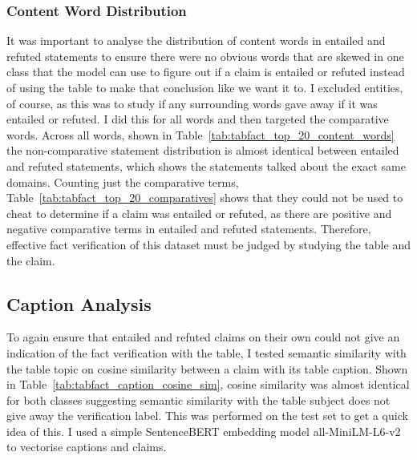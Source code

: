 \subsubsection{Content Word Distribution}
It was important to analyse the distribution of content words in entailed and refuted statements to ensure there were no obvious words that are skewed in one class that the model can use to figure out if a claim is entailed or refuted instead of using the table to make that conclusion like we want it to. I excluded entities, of course, as this was to study if any surrounding words gave away if it was entailed or refuted. I did this for all words and then targeted the comparative words. Across all words, shown in Table~\ref{tab:tabfact_top_20_content_words} the non-comparative statement distribution is almost identical between entailed and refuted statements, which shows the statements talked about the exact same domains. Counting just the comparative terms, Table~\ref{tab:tabfact_top_20_comparatives} shows that they could not be used to cheat to determine if a claim was entailed or refuted, as there are positive and negative comparative terms in entailed and refuted statements. Therefore, effective fact verification of this dataset must be judged by studying the table and the claim.



\subsection{Caption Analysis}
To again ensure that entailed and refuted claims on their own could not give an indication of the fact verification with the table, I tested semantic similarity with the table topic on cosine similarity between a claim with its table caption. Shown in Table~\ref{tab:tabfact_caption_cosine_sim}, cosine similarity was almost identical for both classes suggesting semantic similarity with the table subject does not give away the verification label. This was performed on the test set to get a quick idea of this. I used a simple SentenceBERT embedding model all-MiniLM-L6-v2 \parencite{reimers2019sentence} to vectorise captions and claims. 


